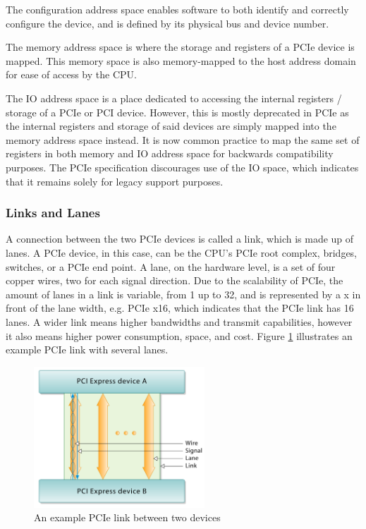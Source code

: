 The configuration address space enables software to both identify and correctly configure the device, and is defined by its physical bus and device number.\cite{oracle_inc_pci_nodate}

The memory address space is where the storage and registers of a PCIe device is mapped.\cite{jackson_pci_2012} This memory space is also memory-mapped to the host address domain for ease of access by the CPU.\cite{oracle_inc_pci_nodate}

The IO address space is a place dedicated to accessing the internal registers / storage of a PCIe or PCI device. However, this is mostly deprecated in PCIe as the internal registers and storage of said devices are simply mapped into the memory address space instead. It is now common practice to map the same set of registers in both memory and IO address space for backwards compatibility purposes. The PCIe specification discourages use of the IO space, which indicates that it remains solely for legacy support purposes.\cite{jackson_pci_2012}

\subsubsection{Links and Lanes}
A connection between the two PCIe devices is called a link, which is made up of lanes. \cite{jackson_pci_2012} A PCIe device, in this case, can be the CPU's PCIe root complex, bridges, switches, or a PCIe end point. A lane, on the hardware level, is a set of four copper wires, two for each signal direction.\cite{jackson_pci_2012} Due to the scalability of PCIe, the amount of lanes in a link is variable, from 1 up to 32, and is represented by a x in front of the lane width, e.g. PCIe x16, which indicates that the PCIe link has 16 lanes. A wider link means higher bandwidths and transmit capabilities, however it also means higher power consumption, space, and cost. \cite{jackson_pci_2012} Figure \ref{fig:link} illustrates an example PCIe link with several lanes.


\begin{figure}
\begin{center}
\includegraphics[height = 200px]{figures/PCIE-link}
\caption{An example PCIe link between two devices \cite{budruk_pci_2014}}
\label{fig:link}
\end{center}
\end{figure}

